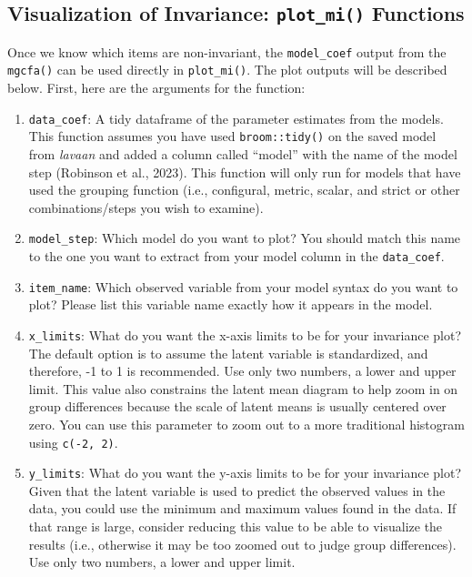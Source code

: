 \documentclass[
  man]{apa7}
\providecommand{\tightlist}{%
  \setlength{\itemsep}{0pt}\setlength{\parskip}{0pt}}
\begin{document}
\newpage

\subsection{\texorpdfstring{Visualization of Invariance: \texttt{plot\_mi()} Functions}{Visualization of Invariance: plot\_mi() Functions}}\label{visualization-of-invariance-plot_mi-functions}

Once we know which items are non-invariant, the \texttt{model\_coef} output from the \texttt{mgcfa()} can be used directly in \texttt{plot\_mi()}. The plot outputs will be described below. First, here are the arguments for the function:

\begin{enumerate}
\def\labelenumi{\arabic{enumi})}
\tightlist
\item
  \texttt{data\_coef}: A tidy dataframe of the parameter estimates from the models. This function assumes you have used \texttt{broom::tidy()} on the saved model from \emph{lavaan} and added a column called ``model'' with the name of the model step (Robinson et al., 2023). This function will only run for models that have used the grouping function (i.e., configural, metric, scalar, and strict or other combinations/steps you wish to examine).
\item
  \texttt{model\_step}: Which model do you want to plot? You should match this name to the one you want to extract from your model column in the \texttt{data\_coef}.
\item
  \texttt{item\_name}: Which observed variable from your model syntax do you want to plot? Please list this variable name exactly how it appears in the model.
\item
  \texttt{x\_limits}: What do you want the x-axis limits to be for your invariance plot? The default option is to assume the latent variable is standardized, and therefore, -1 to 1 is recommended. Use only two numbers, a lower and upper limit. This value also constrains the latent mean diagram to help zoom in on group differences because the scale of latent means is usually centered over zero. You can use this parameter to zoom out to a more traditional histogram using \texttt{c(-2,\ 2)}.
\item
  \texttt{y\_limits}: What do you want the y-axis limits to be for your invariance plot? Given that the latent variable is used to predict the observed values in the data, you could use the minimum and maximum values found in the data. If that range is large, consider reducing this value to be able to visualize the results (i.e., otherwise it may be too zoomed out to judge group differences). Use only two numbers, a lower and upper limit.

\end{enumerate}
\end{document}
